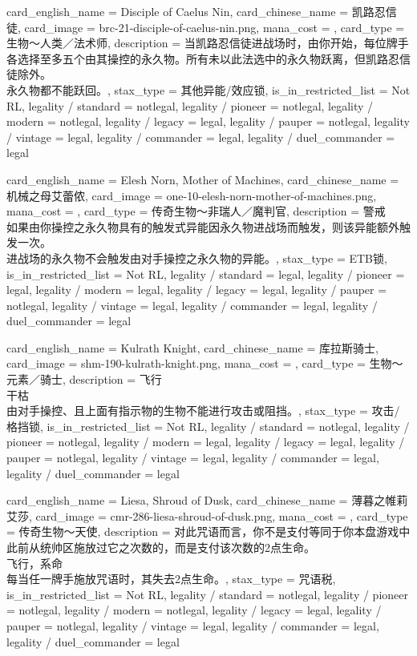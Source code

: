 \documentclass[lang = cn, color = black, 10pt]{AllThatStax}
\begin{document}
\card
{
	card_english_name = {Disciple of Caelus Nin},
	card_chinese_name = {凯路忍信徒},
	card_image = brc-21-disciple-of-caelus-nin.png,
	mana_cost = ,
	card_type = 生物～人类／法术师,
	description = {当凯路忍信徒进战场时，由你开始，每位牌手各选择至多五个由其操控的永久物。所有未以此法选中的永久物跃离，但凯路忍信徒除外。\\
永久物都不能跃回。},
	stax_type = 其他异能/效应锁,
	is_in_restricted_list = Not RL,
	legality / standard = notlegal,
	legality / pioneer = notlegal,
	legality / modern = notlegal,
	legality / legacy = legal,
	legality / pauper = notlegal,
	legality / vintage = legal,
	legality / commander = legal,
	legality / duel_commander = legal
}

\card
{
	card_english_name = {Elesh Norn, Mother of Machines},
	card_chinese_name = {机械之母艾蕾侬},
	card_image = one-10-elesh-norn-mother-of-machines.png,
	mana_cost = ,
	card_type = 传奇生物～非瑞人／魔判官,
	description = {警戒\\
如果由你操控之永久物具有的触发式异能因永久物进战场而触发，则该异能额外触发一次。\\
进战场的永久物不会触发由对手操控之永久物的异能。},
	stax_type = ETB锁,
	is_in_restricted_list = Not RL,
	legality / standard = legal,
	legality / pioneer = legal,
	legality / modern = legal,
	legality / legacy = legal,
	legality / pauper = notlegal,
	legality / vintage = legal,
	legality / commander = legal,
	legality / duel_commander = legal
}

\card
{
	card_english_name = {Kulrath Knight},
	card_chinese_name = {库拉斯骑士},
	card_image = shm-190-kulrath-knight.png,
	mana_cost = ,
	card_type = 生物～元素／骑士,
	description = {飞行\\
干枯 \\
由对手操控、且上面有指示物的生物不能进行攻击或阻挡。},
	stax_type = 攻击/格挡锁,
	is_in_restricted_list = Not RL,
	legality / standard = notlegal,
	legality / pioneer = notlegal,
	legality / modern = legal,
	legality / legacy = legal,
	legality / pauper = notlegal,
	legality / vintage = legal,
	legality / commander = legal,
	legality / duel_commander = legal
}

\card
{
	card_english_name = {Liesa, Shroud of Dusk},
	card_chinese_name = {薄暮之帷莉艾莎},
	card_image = cmr-286-liesa-shroud-of-dusk.png,
	mana_cost = ,
	card_type = 传奇生物～天使,
	description = {对此咒语而言，你不是支付等同于你本盘游戏中此前从统帅区施放过它之次数的，而是支付该次数的2点生命。\\
飞行，系命\\
每当任一牌手施放咒语时，其失去2点生命。},
	stax_type = 咒语税,
	is_in_restricted_list = Not RL,
	legality / standard = notlegal,
	legality / pioneer = notlegal,
	legality / modern = notlegal,
	legality / legacy = legal,
	legality / pauper = notlegal,
	legality / vintage = legal,
	legality / commander = legal,
	legality / duel_commander = legal
}
\end{document}
